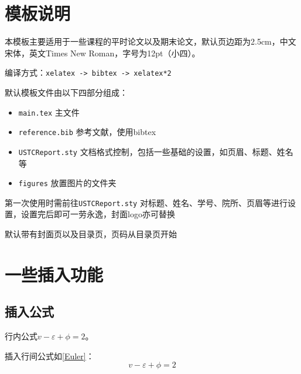 \documentclass[12pt,hyperref,a4paper,UTF8]{ctexart}
\begin{document}
\cover

%
%

\thispagestyle{empty} %

\newpage
\tableofcontents

\newpage


\section{模板说明}
本模板主要适用于一些课程的平时论文以及期末论文，默认页边距为2.5cm，中文宋体，英文Times New Roman，字号为12pt（小四）。

编译方式：\verb|xelatex -> bibtex -> xelatex*2|


默认模板文件由以下四部分组成：
\begin{itemize}
    \item \texttt{main.tex} 主文件
    \item \texttt{reference.bib} 参考文献，使用bibtex
    \item \texttt{USTCReport.sty} 文档格式控制，包括一些基础的设置，如页眉、标题、姓名等
    \item \texttt{figures} 放置图片的文件夹
\end{itemize}

第一次使用时需前往\texttt{USTCReport.sty} 对标题、姓名、学号、院所、页眉等进行设置，设置完后即可一劳永逸，封面logo亦可替换

默认带有封面页以及目录页，页码从目录页开始

\section{一些插入功能}
\subsection{插入公式}
行内公式$v-\varepsilon+\phi=2$。

插入行间公式如\autoref{Euler}：
\begin{equation}
    v-\varepsilon+\phi=2
    \label{Euler}
\end{equation}
\end{document}

